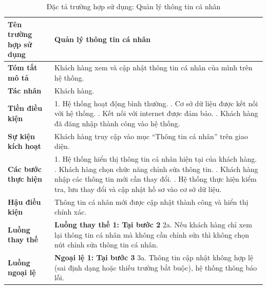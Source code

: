 {
\begin{longtable}{|>{\bfseries}p{4cm}|p{11.5cm}|}
\caption{Đặc tả trường hợp sử dụng: Quản lý thông tin cá nhân}
\label{tab:uc-profile-management} \\
\hline
\textbf{Tên trường hợp sử dụng} & Quản lý thông tin cá nhân \\
\hline
\textbf{Tóm tắt mô tả} & Khách hàng xem và cập nhật thông tin cá nhân của mình trên hệ thống. \\
\hline
\textbf{Tác nhân} & Khách hàng. \\
\hline
\textbf{Tiền điều kiện} & 1. Hệ thống hoạt động bình thường. \newline
2. Cơ sở dữ liệu được kết nối với hệ thống. \newline
3. Kết nối với internet được đảm bảo. \newline
4. Khách hàng đã đăng nhập thành công vào hệ thống. \\
\hline
\textbf{Sự kiện kích hoạt} & Khách hàng truy cập vào mục “Thông tin cá nhân” trên giao diện. \\
\hline
\textbf{Các bước thực hiện} & 1. Hệ thống hiển thị thông tin cá nhân hiện tại của khách hàng. \newline
2. Khách hàng chọn chức năng chỉnh sửa thông tin. \newline
3. Khách hàng nhập các thông tin mới cần thay đổi. \newline
4. Hệ thống thực hiện kiểm tra, lưu thay đổi và cập nhật hồ sơ vào cơ sở dữ liệu. \\
\hline
\textbf{Hậu điều kiện} & Thông tin cá nhân mới được cập nhật thành công và hiển thị chính xác. \\
\hline
\textbf{Luồng thay thế} & \textbf{Luồng thay thế 1: Tại bước 2} \newline
2a. Nếu khách hàng chỉ xem lại thông tin cá nhân mà không cần chỉnh sửa thì không chọn nút chỉnh sửa thông tin cá nhân. \\
\hline
\textbf{Luồng ngoại lệ} & \textbf{Ngoại lệ 1: Tại bước 3} \newline
3a. Thông tin cập nhật không hợp lệ (sai định dạng hoặc thiếu trường bắt buộc), hệ thống thông báo lỗi. \\
\hline
\end{longtable}

}
